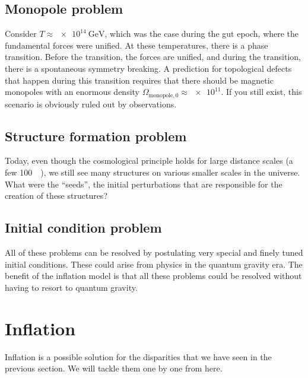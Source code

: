 \subsection{Monopole problem}
Consider $T \approx \SI{e14}{\GeV}$, which was the case during the \ac{gut} epoch, where the fundamental forces were unified. At these temperatures, there is a phase transition. Before the transition, the forces are unified, and during the transition, there is a spontaneous symmetry breaking. A prediction for topological defects that happen during this transition requires that there should be magnetic monopoles with an enormous density $\Omega_{\text{monopole},0} \approx \num{e11}$. If you still exist, this scenario is obviously ruled out by observations.

\subsection{Structure formation problem}
Today, even though the cosmological principle holds for large distance scales (a few \SI{100}{\mega\parsec}), we still see many structures on various smaller scales in the universe. What were the \enquote{seeds}, the initial perturbations that are responsible for the creation of these structures?

\subsection{Initial condition problem}
All of these problems can be resolved by postulating very special and finely tuned initial conditions. These could arise from physics in the quantum gravity era. The benefit of the inflation model is that all these problems could be resolved without having to resort to quantum gravity.




\section{Inflation}

Inflation is a possible solution for the disparities that we have seen in the previous section. We will tackle them one by one from here.

